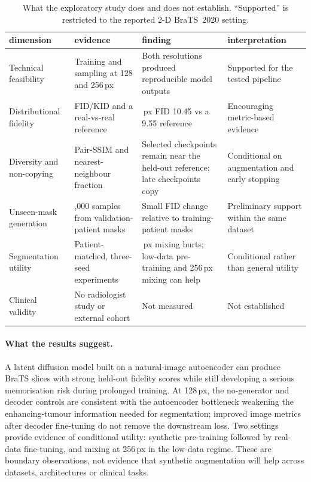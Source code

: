 \documentclass[10pt,a4paper]{article}
\begin{document}
\begin{table}[t]
  \centering\small
  \setlength{\tabcolsep}{4pt}
  \renewcommand{\arraystretch}{1.08}
  \caption{What the exploratory study does and does not establish. ``Supported'' is restricted to the reported 2-D BraTS~2020 setting.}
  \label{tab:viability}
  \begin{tabular}{@{}>{\raggedright\arraybackslash}p{}>{\raggedright\arraybackslash}p{}>{\raggedright\arraybackslash}p{}>{\raggedright\arraybackslash}p{}@{}}
    \toprule
    dimension & evidence & finding & interpretation \\
    \midrule
    Technical feasibility & Training and sampling at 128 and 256\,px & Both resolutions produced reproducible model outputs & Supported for the tested pipeline \\
    Distributional fidelity & FID/KID and a real-vs-real reference & 256\,px FID 10.45 vs a 9.55 reference & Encouraging metric-based evidence \\
    Diversity and non-copying & Pair-SSIM and nearest-neighbour fraction & Selected checkpoints remain near the held-out reference; late checkpoints copy & Conditional on augmentation and early stopping \\
    Unseen-mask generation & 5,000 samples from validation-patient masks & Small FID change relative to training-patient masks & Preliminary support within the same dataset \\
    Segmentation utility & Patient-matched, three-seed experiments & 128\,px mixing hurts; low-data pre-training and 256\,px mixing can help & Conditional rather than general utility \\
    Clinical validity & No radiologist study or external cohort & Not measured & Not established \\
    \bottomrule
  \end{tabular}
\end{table}
\FloatBarrier

\paragraph{What the results suggest.} A latent diffusion model built on a natural-image autoencoder can produce BraTS slices with strong held-out fidelity scores while still developing a serious memorisation risk during prolonged training. At 128\,px, the no-generator and decoder controls are consistent with the autoencoder bottleneck weakening the enhancing-tumour information needed for segmentation; improved image metrics after decoder fine-tuning do not remove the downstream loss. Two settings provide evidence of conditional utility: synthetic pre-training followed by real-data fine-tuning, and mixing at 256\,px in the low-data regime. These are boundary observations, not evidence that synthetic augmentation will help across datasets, architectures or clinical tasks.
\end{document}

